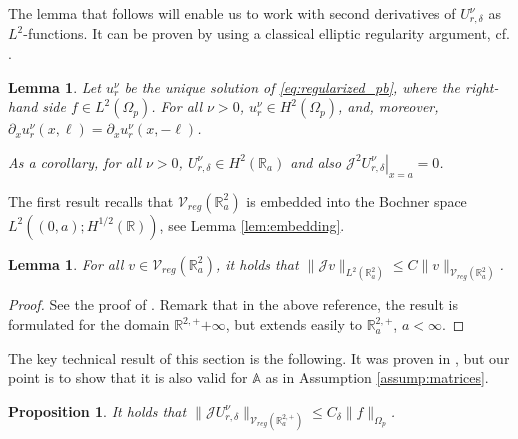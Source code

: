\documentclass[report]{elsarticle}
\newtheorem{proposition}[theorem]{Proposition}
\newtheorem{lemma}[theorem]{Lemma}
\numberwithin{theorem}{section}
\begin{document}
The lemma that follows will enable us to work with second derivatives of $U^{\nu}_{r,\delta}$ as $L^2$-functions. It can be proven by using a classical elliptic regularity argument, cf. \cite[Theorem 4.18]{mclean}. 
\begin{lemma}
	\label{lem:ellregc}
	Let  $u^{\nu}_r$ be the unique solution of \eqref{eq:regularized_pb}, where the right-hand side $f\in L^2(\Omega_p)$. For all $\nu>0$, $u^{\nu}_r\in H^2(\Omega_p)$, and, moreover, $\partial_x u^{\nu}_r(x,\ell)=\partial_x u^{\nu}_r(x,-\ell)$. 
	
	
	As a corollary, for all $\nu>0$, $U^{\nu}_{r,\delta}\in H^2(\mathbb{R}_a)$ and also $\left.\mathcal{J}^2 U^{\nu}_{r,\delta}\right|_{x=a}=0$. 
\end{lemma}

The first result recalls that $\mathcal{V}_{reg}(\mathbb{R}^2_a)$ is embedded into the Bochner space $L^2((0, a); H^{1/2}(\mathbb{R}))$, see Lemma \ref{lem:embedding}.
\begin{lemma}
	\label{lem:fourier_embedding}
	For all $v\in \mathcal{V}_{reg}(\mathbb{R}^2_a)$, it holds that $\|\mathcal{J} v\|_{L^2(\mathbb{R}^2_a)}\leq C\|v\|_{\mathcal{V}_{reg}(\mathbb{R}^2_a)}$. 
\end{lemma}
\begin{proof}
	See the proof of \cite[Lemma 1 and 2]{baouendi_goulaouic}. Remark that in the above reference, the result is formulated for the domain $\mathbb{R}^{2,+}{+\infty}$, but extends easily to $\mathbb{R}^{2,+}_a$, $a<\infty$.
\end{proof}
The key technical result of this section is the following. It was proven in \cite{baouendi_goulaouic}, but our point is to show that it is also valid for $\mathbb{A}$ as in Assumption \ref{assump:matrices}. 
\begin{proposition}
	\label{prop:dyu}
	It holds that $\|\mathcal{J} U^{\nu}_{r,\delta}\|_{\mathcal{V}_{reg}(\mathbb{R}^{2,+}_a)}\leq C_{\delta}\|f\|_{\Omega_p}$.
\end{proposition}
\end{document}
